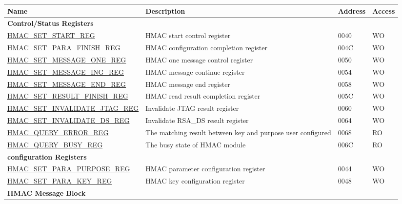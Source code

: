 \begin{longtable}{ | p{6cm} | p{7.2cm} | p{1.3cm} | p{1cm} | }
\hline\rowcolor{lightgray}
Name & Description &  Address & Access \\ \hline
\endhead
\multicolumn{4}{|l|}{\textbf{Control/Status Registers}} \\ \hline
\hyperref[regdesc:HMACSETSTARTREG]{HMAC\_SET\_START\_REG} & HMAC start control register & \hexprefix{}0040 & WO \\ \hline
\hyperref[regdesc:HMACSETPARAFINISHREG]{HMAC\_SET\_PARA\_FINISH\_REG} & HMAC configuration completion register & \hexprefix{}004C & WO \\ \hline
\hyperref[regdesc:HMACSETMESSAGEONEREG]{HMAC\_SET\_MESSAGE\_ONE\_REG} & HMAC one message control register & \hexprefix{}0050 & WO \\ \hline
\hyperref[regdesc:HMACSETMESSAGEINGREG]{HMAC\_SET\_MESSAGE\_ING\_REG} & HMAC message continue register & \hexprefix{}0054 & WO \\ \hline
\hyperref[regdesc:HMACSETMESSAGEENDREG]{HMAC\_SET\_MESSAGE\_END\_REG} & HMAC message end register & \hexprefix{}0058 & WO \\ \hline
\hyperref[regdesc:HMACSETRESULTFINISHREG]{HMAC\_SET\_RESULT\_FINISH\_REG} & HMAC read result completion register & \hexprefix{}005C & WO \\ \hline
\hyperref[regdesc:HMACSETINVALIDATEJTAGREG]{HMAC\_SET\_INVALIDATE\_JTAG\_REG} & Invalidate JTAG result register & \hexprefix{}0060 & WO \\ \hline
\hyperref[regdesc:HMACSETINVALIDATEDSREG]{HMAC\_SET\_INVALIDATE\_DS\_REG} & Invalidate RSA\_DS result register & \hexprefix{}0064 & WO \\ \hline
\hyperref[regdesc:HMACQUERYERRORREG]{HMAC\_QUERY\_ERROR\_REG} & The matching result between key and purpose user configured & \hexprefix{}0068 & RO \\ \hline
\hyperref[regdesc:HMACQUERYBUSYREG]{HMAC\_QUERY\_BUSY\_REG} & The busy state of HMAC module & \hexprefix{}006C & RO \\ \hline
\multicolumn{4}{|l|}{\textbf{configuration Registers}} \\ \hline
\hyperref[regdesc:HMACSETPARAPURPOSEREG]{HMAC\_SET\_PARA\_PURPOSE\_REG} & HMAC parameter configuration register & \hexprefix{}0044 & WO \\ \hline
\hyperref[regdesc:HMACSETPARAKEYREG]{HMAC\_SET\_PARA\_KEY\_REG} & HMAC key configuration register & \hexprefix{}0048 & WO \\ \hline
\multicolumn{4}{|l|}{\textbf{HMAC Message Block}} \\ \hline

\end{longtable}
